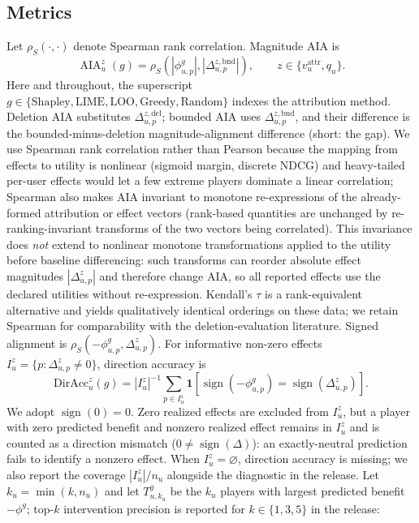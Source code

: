 \documentclass[manuscript,screen,review,anonymous]{acmart}
\newcommand{\AIA}{\operatorname{AIA}}
\begin{document}
\subsection{Metrics}
Let $\rho_S(\cdot,\cdot)$ denote Spearman rank correlation. Magnitude AIA is
\begin{equation}
\AIA_u^z(g)=\rho_S(|\phi^g_{u,p}|,|\Delta_{u,p}^{z,\mathrm{bnd}}|),\qquad z\in\{v_u^{\mathrm{attr}},q_u\}.
\label{eq:aia}
\end{equation}
Here and throughout, the superscript $g\in\{\mathrm{Shapley},\mathrm{LIME},\mathrm{LOO},\mathrm{Greedy},\mathrm{Random}\}$ indexes the attribution method. Deletion AIA substitutes $\Delta_{u,p}^{z,\mathrm{del}}$; bounded AIA uses $\Delta_{u,p}^{z,\mathrm{bnd}}$, and their difference is the bounded-minus-deletion magnitude-alignment difference (short: the gap). We use Spearman rank correlation rather than Pearson because the mapping from effects to utility is nonlinear (sigmoid margin, discrete NDCG) and heavy-tailed per-user effects would let a few extreme players dominate a linear correlation; Spearman also makes AIA invariant to monotone re-expressions of the already-formed attribution or effect vectors (rank-based quantities are unchanged by re-ranking-invariant transforms of the two vectors being correlated). This invariance does \emph{not} extend to nonlinear monotone transformations applied to the utility before baseline differencing: such transforms can reorder absolute effect magnitudes $|\Delta^z_{u,p}|$ and therefore change AIA, so all reported effects use the declared utilities without re-expression. Kendall's $\tau$ is a rank-equivalent alternative and yields qualitatively identical orderings on these data; we retain Spearman for comparability with the deletion-evaluation literature. Signed alignment is $\rho_S(-\phi^g_{u,p},\Delta_{u,p}^z)$. For informative non-zero effects $I_u^z=\{p:\Delta_{u,p}^z\ne0\}$, direction accuracy is
\begin{equation}
\mathrm{DirAcc}_u^z(g)=|I_u^z|^{-1}\sum_{p\in I_u^z}\mathbf{1}\left[\operatorname{sign}(-\phi^g_{u,p})=\operatorname{sign}(\Delta_{u,p}^z)\right].
\label{eq:diracc}
\end{equation}
We adopt $\operatorname{sign}(0)=0$. Zero realized effects are excluded from $I_u^z$, but a player with zero predicted benefit and nonzero realized effect remains in $I_u^z$ and is counted as a direction mismatch ($0\ne\operatorname{sign}(\Delta)$): an exactly-neutral prediction fails to identify a nonzero effect. When $I_u^z=\varnothing$, direction accuracy is missing; we also report the coverage $|I_u^z|/n_u$ alongside the diagnostic in the release. Let $k_u=\min(k,n_u)$ and let $T_{u,k_u}^g$ be the $k_u$ players with largest predicted benefit $-\phi^g$; top-$k$ intervention precision is reported for $k\in\{1,3,5\}$ in the release:
\end{document}
